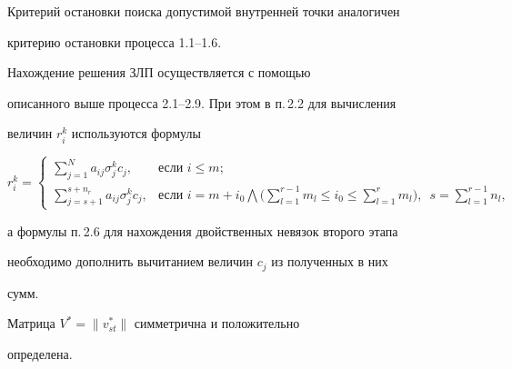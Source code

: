 Критерий остановки поиска допустимой внутренней точки аналогичен


критерию остановки процесса 1.1--1.6.





Нахождение решения ЗЛП осуществляется с помощью


описанного выше процесса 2.1--2.9. При этом в п.\,2.2 для вычисления


величин $r_i^k$ используются формулы


$$


r_i^k =


\begin{cases}


\sum\limits_{j=1}^Na_{ij}\sigma_j^kc_j, & \text{если } i\leq m;\\


\sum\limits_{j=s+1}^{s+n_r}a_{ij}\sigma_j^kc_j, & \text{если }


i=m+i_0 \bigwedge


\Big(\sum\limits_{l=1}^{r-1}m_l\leq i_0\leq


\sum\limits_{l=1}^rm_l\Big),\ \; s=\sum\limits_{l=1}^{r-1}n_l,


\end{cases}


$$


а формулы п.\,2.6 для нахождения двойственных невязок второго этапа


необходимо дополнить вычитанием величин $c_j$ из полученных в них


сумм.





\begin{lem}\label{lemV*}


Матрица $V^* = \|v_{st}^*\|$ симметрична и положительно


определена.


\end{lem}





